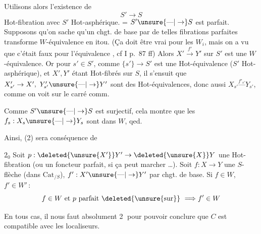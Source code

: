 Utilisons alors l'existence de
\[ S'\longrightarrow S \]
Hot-fibration avec $S'$ Hot-asphérique.  = $S'\unsure{\text{---}|\to}S$ est parfait. Supposons qu'on sache qu'un chgt. de base par de telles fibrations parfaites transforme  $W$-équivalence en itou. (Ça doit être vrai pour les $W_i$, mais on a vu que c'était faux pour l'équivalence , cf I p.~87 ff) Alors
$X'\xrightarrow{f'}Y'$ sur $S'$ est une $W$-équivalence. Or pour $s'\in S'$, comme $\{s'\}\longrightarrow S'$ est une Hot-équivalence ($S'$ Hot-asphérique), et $X',Y'$ étant Hot-fibrés sur $S$, il s'ensuit que $X'_{s'}\to X',\ Y'_{s'}\unsure{\text{---}|\to}Y'$ sont des Hot-équivalences, donc aussi $X_{s'}\overset{f'_{s'}}{\text{---}}Y_{s'}$, comme on voit sur le carré comm.


Comme $S'\unsure{\text{---}|\to}S$ est surjectif, cela montre que les $f_s:X_s\unsure{\text{---}|\to}Y_s$ sont dans $W$, qed.

Ainsi, (2) sera conséquence de

\textcircled{$2_0$} Soit $p:\deleted{\unsure{X'}}Y'\to\deleted{\unsure{X}}Y$ une Hot-fibration (ou  un foncteur parfait, si ça peut marcher \ldots). Soit $f:X\to Y$ une $S$-flèche (dans $\mathrm{Cat}_{/S}$),  $f':X'\unsure{\text{---}|\to}Y'$ par chgt. de base. Si $f\in W$, $f'\in W'$\,:
\[ f\in W\ \text{et}\ p\ \text{parfait}\ \deleted{\unsure{\text{sur}}}\ \Longrightarrow f'\in W \]

En tous cas, il nous faut absolument \textcircled{2} pour pouvoir conclure que $C$ est compatible avec les localiseurs.


